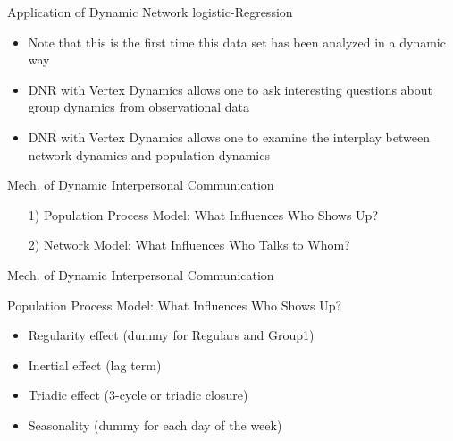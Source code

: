\documentclass[10pt]{beamer}
\begin{document}
\begin{frame}{}
\begin{block}{Application of Dynamic Network logistic-Regression}
\begin{itemize}
\item Note that this is the first time this data set has been analyzed in a dynamic way
\item \alert{DNR with Vertex Dynamics} allows one to ask interesting questions about group dynamics from observational data
\item \alert{DNR with Vertex Dynamics} allows one to examine the interplay between network dynamics and population dynamics
\end{itemize}
\end{block}
\end{frame}

\begin{frame}{Mech. of Dynamic Interpersonal Communication}
\begin{block}{}
\begin{itemize}
\item[1)] Population Process Model: What Influences Who Shows Up?
\item[2)] Network Model: What Influences Who Talks to Whom?
\end{itemize}
\end{block}
\end{frame}

\begin{frame}{Mech. of Dynamic Interpersonal Communication}
\begin{block}{Population Process Model: What Influences Who Shows Up?}
\begin{itemize}
\item<1-5> Regularity effect (dummy for Regulars and Group1)
\item<1-5> Inertial effect (lag term)
\item<1-5> Triadic effect (3-cycle or triadic closure)
\item<1-5> Seasonality (dummy for each day of the week)
\end{itemize}
\end{block}
\end{frame}
\end{document}
